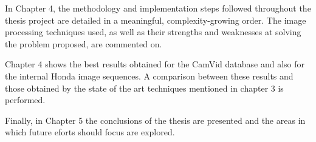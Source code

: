 In Chapter 4, the methodology and implementation steps followed throughout the thesis project are detailed in a meaningful, complexity-growing order. The image processing techniques used, as well as their strengths and weaknesses at solving the problem proposed, are commented on.

Chapter 4 shows the best results obtained for the CamVid database and also for the internal Honda image sequences. A comparison between these results and those obtained by the state of the art techniques mentioned in chapter 3 is performed.
 
Finally, in Chapter 5 the conclusions of the thesis are presented and the areas in
which future eforts should focus are explored.